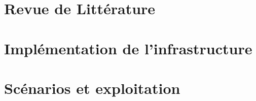 \documentclass{ifri}
\begin{document}
\maketitle

\frontmatter




\tableofcontents
\listoffigures
\listoftables

\printglossary[type=\acronymtype, title=Liste des acronymes]

\mainmatter


\chapter{Revue de Littérature}\label{chap:1}

 
\chapter{Implémentation de l'infrastructure}\label{chap:2}

 
\chapter{Scénarios et exploitation}\label{chap:3}

 


\backmatter



\appendix

\end{document}
